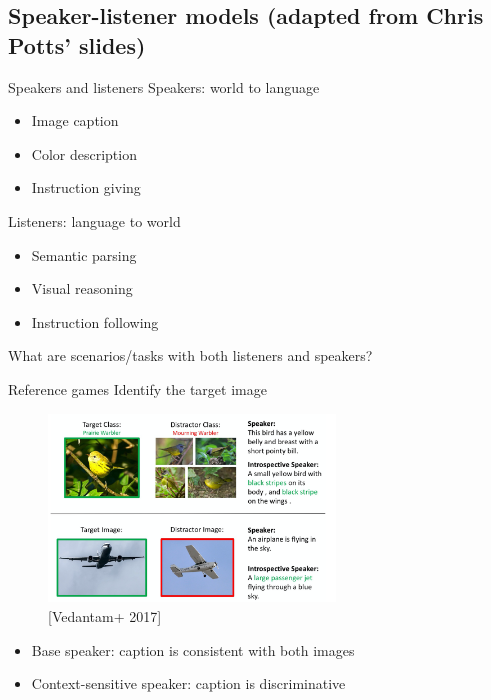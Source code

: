 \documentclass[usenames,dvipsnames,notes]{beamer}
\begin{document}
\subsection{Speaker-listener models (adapted from Chris Potts' slides)}
\begin{frame}
    {Speakers and listeners}
    Speakers: world to language\\
    \begin{itemize}
        \item Image caption
        \item Color description
        \item Instruction giving
    \end{itemize}

    Listeners: language to world\\
    \begin{itemize}
        \item Semantic parsing
        \item Visual reasoning
        \item Instruction following
    \end{itemize}

    What are scenarios/tasks with both listeners and speakers?
\end{frame}

\begin{frame}
    {Reference games}
    Identify the target image
    \begin{figure}
        \includegraphics[height=5cm]{figures/dis-caption}
        \caption{[Vedantam+ 2017]}
    \end{figure}
    \vspace{-1em}
    \begin{itemize}
        \item Base speaker: caption is consistent with both images
        \item Context-sensitive speaker: caption is discriminative
    \end{itemize}
\end{frame}
\end{document}
